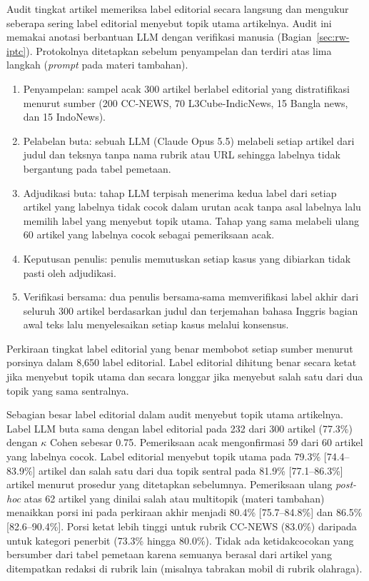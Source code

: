 \documentclass{ieeeaccess}
\newcommand{\en}[1]{\textit{#1}}
\begin{document}
Audit tingkat artikel memeriksa label editorial secara langsung dan mengukur seberapa sering label editorial menyebut topik utama artikelnya. Audit ini memakai anotasi berbantuan LLM dengan verifikasi manusia (Bagian~\ref{sec:rw-iptc}). Protokolnya ditetapkan sebelum penyampelan dan terdiri atas lima langkah (\en{prompt} pada materi tambahan).
\begin{enumerate}
  \item Penyampelan: sampel acak 300 artikel berlabel editorial yang distratifikasi menurut sumber (200 CC-NEWS, 70 L3Cube-IndicNews, 15 Bangla news, dan 15 IndoNews).
  \item Pelabelan buta: sebuah LLM (Claude Opus 5.5) melabeli setiap artikel dari judul dan teksnya tanpa nama rubrik atau URL sehingga labelnya tidak bergantung pada tabel pemetaan.
  \item Adjudikasi buta: tahap LLM terpisah menerima kedua label dari setiap artikel yang labelnya tidak cocok dalam urutan acak tanpa asal labelnya lalu memilih label yang menyebut topik utama. Tahap yang sama melabeli ulang 60 artikel yang labelnya cocok sebagai pemeriksaan acak.
  \item Keputusan penulis: penulis memutuskan setiap kasus yang dibiarkan tidak pasti oleh adjudikasi.
  \item Verifikasi bersama: dua penulis bersama-sama memverifikasi label akhir dari seluruh 300 artikel berdasarkan judul dan terjemahan bahasa Inggris bagian awal teks lalu menyelesaikan setiap kasus melalui konsensus.
\end{enumerate}
Perkiraan tingkat label editorial yang benar membobot setiap sumber menurut porsinya dalam 8,650 label editorial. Label editorial dihitung benar secara ketat jika menyebut topik utama dan secara longgar jika menyebut salah satu dari dua topik yang sama sentralnya.

Sebagian besar label editorial dalam audit menyebut topik utama artikelnya. Label LLM buta sama dengan label editorial pada 232 dari 300 artikel (77.3\%) dengan $\kappa$ Cohen sebesar 0.75. Pemeriksaan acak mengonfirmasi 59 dari 60 artikel yang labelnya cocok. Label editorial menyebut topik utama pada 79.3\% [74.4--83.9\%] artikel dan salah satu dari dua topik sentral pada 81.9\% [77.1--86.3\%] artikel menurut prosedur yang ditetapkan sebelumnya. Pemeriksaan ulang \en{post-hoc} atas 62 artikel yang dinilai salah atau multitopik (materi tambahan) menaikkan porsi ini pada perkiraan akhir menjadi 80.4\% [75.7--84.8\%] dan 86.5\% [82.6--90.4\%]. Porsi ketat lebih tinggi untuk rubrik CC-NEWS (83.0\%) daripada untuk kategori penerbit (73.3\% hingga 80.0\%). Tidak ada ketidakcocokan yang bersumber dari tabel pemetaan karena semuanya berasal dari artikel yang ditempatkan redaksi di rubrik lain (misalnya tabrakan mobil di rubrik olahraga).
\end{document}
